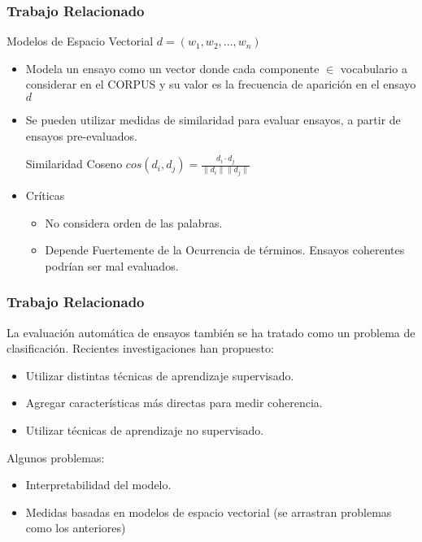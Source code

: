 \documentclass{beamer}
\begin{document}
\begin{frame}
\frametitle{Trabajo Relacionado}

\begin{block}{Modelos de Espacio Vectorial}
$d = (w_1, w_2, ..., w_n)$
\end{block}

\begin{itemize}
\item Modela un ensayo como un vector donde cada componente $\in$ vocabulario a considerar en el CORPUS y su valor es la frecuencia de aparición en el ensayo $d$
\item Se pueden utilizar medidas de similaridad para evaluar ensayos, a partir de ensayos pre-evaluados.

\begin{block}{Similaridad Coseno}
$cos(d_i, d_j) = \frac{d_i\cdot d_j}{\|d_i\| \|d_j\|}$
\end{block}

\item Críticas
\begin{itemize}
\item No considera orden de las palabras.
\item Depende Fuertemente de la Ocurrencia de términos. Ensayos coherentes podrían ser mal evaluados.
\end{itemize}

\end{itemize}
\end{frame}


\begin{frame}
\frametitle{Trabajo Relacionado}

La evaluación automática de ensayos también se ha tratado como un problema de clasificación. Recientes investigaciones han propuesto:

\begin{itemize}
	\item Utilizar distintas técnicas de aprendizaje supervisado.
	\item Agregar características más directas para medir coherencia.
	\item Utilizar técnicas de aprendizaje no supervisado.
\end{itemize}

Algunos problemas:

\begin{itemize}
\item Interpretabilidad del modelo.
\item Medidas basadas en modelos de espacio vectorial (se arrastran problemas como los anteriores)
\end{itemize}
\end{frame}
\end{document}
